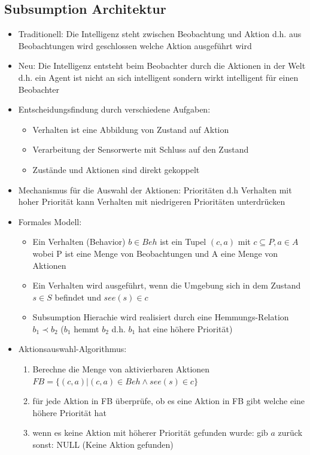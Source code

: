 \documentclass{article} %
\begin{document}
	\subsection{Subsumption Architektur}
	\begin{itemize}
		\item Traditionell: Die Intelligenz steht zwischen Beobachtung und Aktion d.h. aus Beobachtungen wird geschlossen welche Aktion ausgeführt wird
		\item Neu: Die Intelligenz entsteht beim Beobachter durch die Aktionen in der Welt d.h. ein Agent ist nicht an sich intelligent sondern wirkt intelligent für einen Beobachter
		\item Entscheidungsfindung durch verschiedene Aufgaben:
		\begin{itemize}
			\item Verhalten ist eine Abbildung von Zustand auf Aktion
			\item Verarbeitung der Sensorwerte mit Schluss auf den Zustand
			\item Zustände und Aktionen sind direkt gekoppelt
		\end{itemize}
		\item Mechanismus für die Auswahl der Aktionen: Prioritäten d.h Verhalten mit hoher Priorität kann Verhalten mit niedrigeren Prioritäten unterdrücken
		\item Formales Modell:
		\begin{itemize}
			\item Ein Verhalten (Behavior) $b \in Beh$ ist ein Tupel $(c,a)$ mit $c \subseteq P, a \in A$ wobei P ist eine Menge von Beobachtungen und A eine Menge von Aktionen
			\item Ein Verhalten wird ausgeführt, wenn die Umgebung sich in dem Zustand $s\in S$ befindet und $see(s) \in c$
			\item Subsumption Hierachie wird realisiert durch eine Hemmungs-Relation $b_{1} \prec b_{2}$ ($b_{1}$ hemmt $b_{2}$ d.h. $b_{1}$ hat eine höhere Priorität)
		\end{itemize}
		\item Aktionsauswahl-Algorithmus:
		\begin{enumerate}
			\item Berechne die Menge von aktivierbaren Aktionen $FB = \{(c,a)|(c,a)\in Beh \wedge see(s)\in c\}$
			\item für jede Aktion in FB überprüfe, ob es eine Aktion in FB gibt welche eine höhere Priorität hat
			\item wenn es keine Aktion mit höherer Priorität gefunden wurde: gib $a$ zurück sonst: NULL (Keine Aktion gefunden)

\end{enumerate}
\end{itemize}
\end{document}
